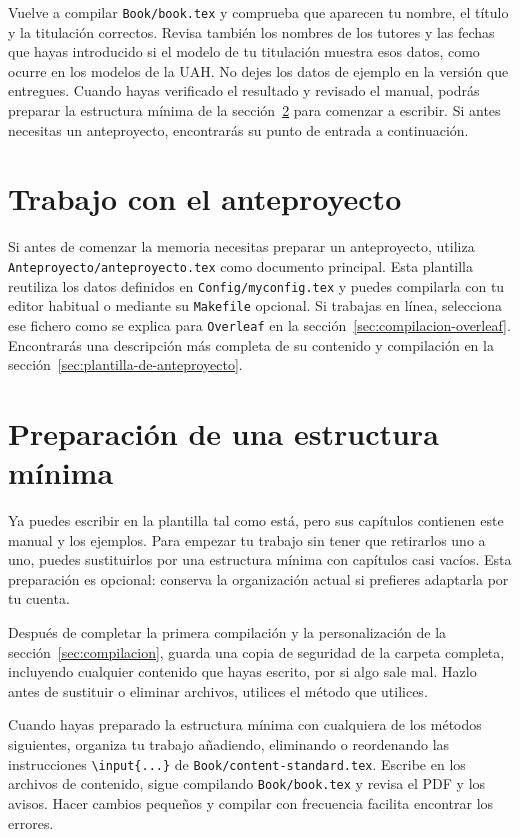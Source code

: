 Vuelve a compilar \texttt{Book/book.tex} y comprueba que aparecen tu nombre, el título y la titulación correctos. Revisa también los nombres de los tutores y las fechas que hayas introducido si el modelo de tu titulación muestra esos datos, como ocurre en los modelos de la UAH. No dejes los datos de ejemplo en la versión que entregues. Cuando hayas verificado el resultado y revisado el manual, podrás preparar la estructura mínima de la sección~\ref{sec:estructura-minima} para comenzar a escribir. Si antes necesitas un anteproyecto, encontrarás su punto de entrada a continuación.

\section{Trabajo con el anteproyecto}
\label{sec:primeros-pasos-anteproyecto}

Si antes de comenzar la memoria necesitas preparar un anteproyecto, utiliza \texttt{Anteproyecto/anteproyecto.tex} como documento principal. Esta plantilla reutiliza los datos definidos en \texttt{Config/myconfig.tex} y puedes compilarla con tu editor habitual o mediante su \texttt{Makefile} opcional. Si trabajas en línea, selecciona ese fichero como se explica para \texttt{Overleaf} en la sección~\ref{sec:compilacion-overleaf}. Encontrarás una descripción más completa de su contenido y compilación en la sección~\ref{sec:plantilla-de-anteproyecto}.

\section{Preparación de una estructura mínima}
\label{sec:estructura-minima}

Ya puedes escribir en la plantilla tal como está, pero sus capítulos contienen este manual y los ejemplos. Para empezar tu trabajo sin tener que retirarlos uno a uno, puedes sustituirlos por una estructura mínima con capítulos casi vacíos. Esta preparación es opcional: conserva la organización actual si prefieres adaptarla por tu cuenta.

Después de completar la primera compilación y la personalización de la sección~\ref{sec:compilacion}, guarda una copia de seguridad de la carpeta completa, incluyendo cualquier contenido que hayas escrito, por si algo sale mal. Hazlo antes de sustituir o eliminar archivos, utilices el método que utilices.

Cuando hayas preparado la estructura mínima con cualquiera de los métodos siguientes, organiza tu trabajo añadiendo, eliminando o reordenando las instrucciones \texttt{\textbackslash{}input\{...\}} de \texttt{Book/content-standard.tex}. Escribe en los archivos de contenido, sigue compilando \texttt{Book/book.tex} y revisa el PDF y los avisos. Hacer cambios pequeños y compilar con frecuencia facilita encontrar los errores.

